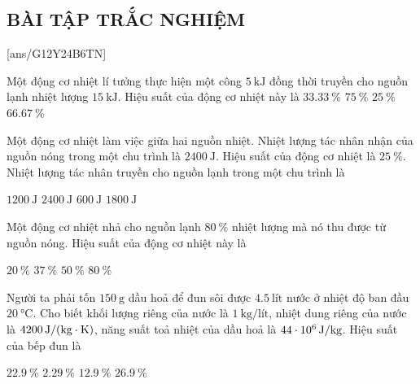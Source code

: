 \subsection{BÀI TẬP TRẮC NGHIỆM}
[ans/G12Y24B6TN]
\begin{ex}
	Một động cơ nhiệt lí tưởng thực hiện một công $\SI{5}{\kilo\joule}$ đồng thời truyền cho nguồn lạnh nhiệt lượng $\SI{15}{\kilo\joule}$. Hiệu suất của động cơ nhiệt này là
	\choice
	{$\SI{33.33}{\percent}$}
	{$\SI{75}{\percent}$}
	{\True $\SI{25}{\percent}$}
	{$\SI{66.67}{\percent}$}
\end{ex}
\begin{ex}
	Một động cơ nhiệt làm việc giữa hai nguồn nhiệt. Nhiệt lượng tác nhân nhận của nguồn nóng trong một chu trình là $\SI{2400}{\joule}$. Hiệu suất của động cơ nhiệt là $\SI{25}{\percent}$. Nhiệt lượng tác nhân truyền cho nguồn lạnh trong một chu trình là
	
	\choice
	{$\SI{1200}{\joule}$}
	{$\SI{2400}{\joule}$}
	{$\SI{600}{\joule}$}
	{\True $\SI{1800}{\joule}$}
\end{ex}
\begin{ex}
	Một động cơ nhiệt nhả cho nguồn lạnh $\SI{80}{\percent}$ nhiệt lượng mà nó thu được từ nguồn nóng. Hiệu suất của động cơ nhiệt này là
	
	\choice
	{\True $\SI{20}{\percent}$}
	{$\SI{37}{\percent}$}
	{$\SI{50}{\percent}$}
	{$\SI{80}{\percent}$}
\end{ex}
\begin{ex}
	Người ta phải tốn $\SI{150}{\gram}$ dầu hoả để đun sôi được $\SI{4.5}{\text{lít}}$ nước ở nhiệt độ ban đầu $\SI{20}{\celsius}$. Cho biết khối lượng riêng của nước là $\SI{1}{\kilogram/\text{lít}}$, nhiệt dung riêng của nước là $\SI{4200}{\joule/\left(\kilogram\cdot\kelvin\right)}$, năng suất toả nhiệt của dầu hoả là $\SI{44E6}{\joule/\kilogram}$. Hiệu suất của bếp đun là
	
	\choice
	{\True $\SI{22.9}{\percent}$}
	{$\SI{2.29}{\percent}$}
	{$\SI{12.9}{\percent}$}
	{$\SI{26.9}{\percent}$}
\end{ex}
